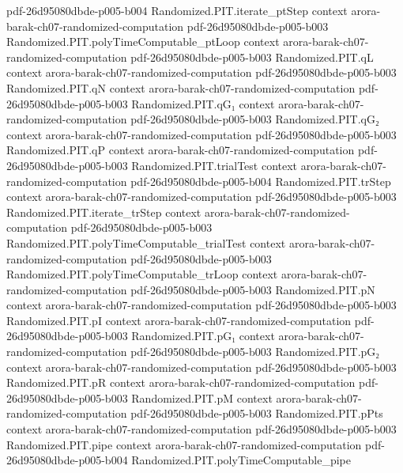 \begin{theorem}
  {pdf-26d95080dbde-p005-b004}
\proofstep
  {Randomized.PIT.iterate_ptStep}
  {context}
  {arora-barak-ch07-randomized-computation}
  {pdf-26d95080dbde-p005-b003}
\proofstep
  {Randomized.PIT.polyTimeComputable_ptLoop}
  {context}
  {arora-barak-ch07-randomized-computation}
  {pdf-26d95080dbde-p005-b003}
\proofstep
  {Randomized.PIT.qL}
  {context}
  {arora-barak-ch07-randomized-computation}
  {pdf-26d95080dbde-p005-b003}
\proofstep
  {Randomized.PIT.qN}
  {context}
  {arora-barak-ch07-randomized-computation}
  {pdf-26d95080dbde-p005-b003}
\proofstep
  {Randomized.PIT.qG₁}
  {context}
  {arora-barak-ch07-randomized-computation}
  {pdf-26d95080dbde-p005-b003}
\proofstep
  {Randomized.PIT.qG₂}
  {context}
  {arora-barak-ch07-randomized-computation}
  {pdf-26d95080dbde-p005-b003}
\proofstep
  {Randomized.PIT.qP}
  {context}
  {arora-barak-ch07-randomized-computation}
  {pdf-26d95080dbde-p005-b003}
\proofstep
  {Randomized.PIT.trialTest}
  {context}
  {arora-barak-ch07-randomized-computation}
  {pdf-26d95080dbde-p005-b004}
\proofstep
  {Randomized.PIT.trStep}
  {context}
  {arora-barak-ch07-randomized-computation}
  {pdf-26d95080dbde-p005-b003}
\proofstep
  {Randomized.PIT.iterate_trStep}
  {context}
  {arora-barak-ch07-randomized-computation}
  {pdf-26d95080dbde-p005-b003}
\proofstep
  {Randomized.PIT.polyTimeComputable_trialTest}
  {context}
  {arora-barak-ch07-randomized-computation}
  {pdf-26d95080dbde-p005-b003}
\proofstep
  {Randomized.PIT.polyTimeComputable_trLoop}
  {context}
  {arora-barak-ch07-randomized-computation}
  {pdf-26d95080dbde-p005-b003}
\proofstep
  {Randomized.PIT.pN}
  {context}
  {arora-barak-ch07-randomized-computation}
  {pdf-26d95080dbde-p005-b003}
\proofstep
  {Randomized.PIT.pI}
  {context}
  {arora-barak-ch07-randomized-computation}
  {pdf-26d95080dbde-p005-b003}
\proofstep
  {Randomized.PIT.pG₁}
  {context}
  {arora-barak-ch07-randomized-computation}
  {pdf-26d95080dbde-p005-b003}
\proofstep
  {Randomized.PIT.pG₂}
  {context}
  {arora-barak-ch07-randomized-computation}
  {pdf-26d95080dbde-p005-b003}
\proofstep
  {Randomized.PIT.pR}
  {context}
  {arora-barak-ch07-randomized-computation}
  {pdf-26d95080dbde-p005-b003}
\proofstep
  {Randomized.PIT.pM}
  {context}
  {arora-barak-ch07-randomized-computation}
  {pdf-26d95080dbde-p005-b003}
\proofstep
  {Randomized.PIT.pPts}
  {context}
  {arora-barak-ch07-randomized-computation}
  {pdf-26d95080dbde-p005-b003}
\proofstep
  {Randomized.PIT.pipe}
  {context}
  {arora-barak-ch07-randomized-computation}
  {pdf-26d95080dbde-p005-b004}
\proofstep
  {Randomized.PIT.polyTimeComputable_pipe}

\end{theorem}
